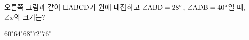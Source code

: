 \noindent\begin{minipage}[t]{0.58\linewidth}\vspace{0pt}\raggedright 오른쪽 그림과 같이 $\square\mathrm{ABCD}$가 원에 내접하고 $\angle\mathrm{ABD}=28^\circ$, $\angle\mathrm{ADB}=40^\circ$일 때, $\angle x$의 크기는?\end{minipage}\hfill\begin{minipage}[t]{0.4\linewidth}\vspace{0pt}\centering \resizebox{\ifdim\width>\linewidth\linewidth\else\width\fi}{!}{}\end{minipage}\par
\begin{choicesii}{$60^\circ$}{$64^\circ$}{$68^\circ$}{$72^\circ$}{$76^\circ$}\end{choicesii}
